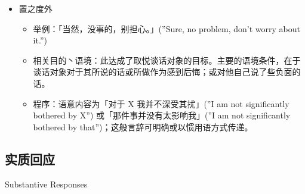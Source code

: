 \begin{itemize}
\begin{itemize}
\end{itemize}
\item 置之度外
\begin{itemize}
\item 举例：「当然，没事的，别担心。」(”Sure, no problem, don’t worry about it.”)
\item 相关目的丶语境：此达成了取悦谈话对象的目标。主要的语境条件，在于谈话对象对于其所说的话或所做作为感到后悔；或对他自己说了些负面的话。 
\item 程序：语意内容为「对于 X 我并不深受其扰」(”I am not significantly bothered by X”) 或「那件事并没有太影响我」(”I am not significantly bothered by that”)；这般言辞可明确或以惯用语方式传递。
\end{itemize}
\end{itemize}

\subsection{实质回应}{Substantive Responses}
